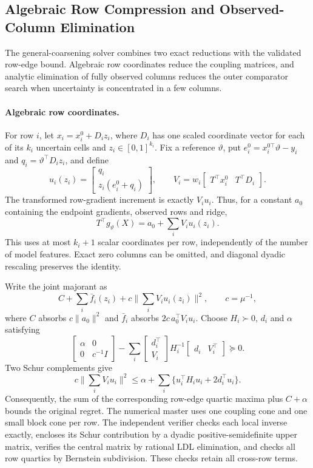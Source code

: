 \subsection{Algebraic Row Compression and Observed-Column Elimination}\label{app:compact-profile}
The general-coarsening solver combines two exact reductions with the validated row-edge bound. Algebraic row coordinates reduce the coupling matrices, and analytic elimination of fully observed columns reduces the outer comparator search when uncertainty is concentrated in a few columns.

\paragraph{Algebraic row coordinates.}
For row $i$, let $x_i=x_i^0+D_i z_i$, where $D_i$ has one scaled coordinate vector for each of its $k_i$ uncertain cells and $z_i\in[0,1]^{k_i}$. Fix a reference $\vartheta$, put $e_i^0=x_i^{0\top}\vartheta-y_i$ and $q_i=\vartheta^\top D_i z_i$, and define
\[
 u_i(z_i)=\begin{bmatrix}q_i\\z_i(e_i^0+q_i)\end{bmatrix},\qquad
 V_i=w_i\begin{bmatrix}T^\top x_i^0&T^\top D_i\end{bmatrix}.
\]
The transformed row-gradient increment is exactly $V_i u_i$. Thus, for a constant $a_0$ containing the endpoint gradients, observed rows and ridge,
\[
 T^\top g_\vartheta(X)=a_0+\sum_i V_i u_i(z_i).
\]
This uses at most $k_i+1$ scalar coordinates per row, independently of the number of model features. Exact zero columns can be omitted, and diagonal dyadic rescaling preserves the identity.

Write the joint majorant as
\[
 C+\sum_i\bar f_i(z_i)+c\Big\|\sum_iV_i u_i(z_i)\Big\|^2,
 \qquad c=\mu^{-1},
\]
where $C$ absorbs $c\|a_0\|^2$ and $\bar f_i$ absorbs $2c\,a_0^\top V_i u_i$. Choose $H_i\succ0$, $d_i$ and $\alpha$ satisfying
\begin{equation}
 \begin{bmatrix}\alpha&0\\0&c^{-1}I\end{bmatrix}
 -\sum_i\begin{bmatrix}d_i^\top\\V_i\end{bmatrix}
 H_i^{-1}\begin{bmatrix}d_i&V_i^\top\end{bmatrix}\succeq0.
 \label{eq:compact-schur}
\end{equation}
Two Schur complements give
\[
 c\Big\|\sum_i V_i u_i\Big\|^2
 \le\alpha+\sum_i\{u_i^\top H_i u_i+2d_i^\top u_i\}.
\]
Consequently, the sum of the corresponding row-edge quartic maxima plus $C+\alpha$ bounds the original regret. The numerical master uses one coupling cone and one small block cone per row. The independent verifier checks each local inverse exactly, encloses its Schur contribution by a dyadic positive-semidefinite upper matrix, verifies the central matrix by rational LDL elimination, and checks all row quartics by Bernstein subdivision. These checks retain all cross-row terms.

